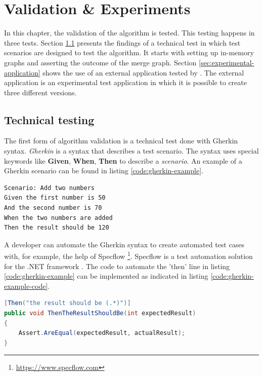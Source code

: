 \chapter{Validation \& Experiments}

In this chapter, the validation of the algorithm is tested. This testing happens in three tests. Section \ref{sec:scenarios-testing} presents the findings of a technical test in which test scenarios are designed to test the algorithm. It starts with setting up in-memory graphs and asserting the outcome of the merge graph. Section \ref{sec:experimental-application} shows the use of an external application tested by \testar. The external application is an experimental test application in which it is possible to create three different versions. 

\section{Technical testing} \label{sec:scenarios-testing}
The first form of algorithm validation is a technical test done with Gherkin syntax. \textit{Gherkin} is a syntax that describes a test scenario. The syntax uses special keywords like \textbf{Given}, \textbf{When}, \textbf{Then} to describe a \textit{scenario}. An example of a Gherkin scenario can be found in listing \ref{code:gherkin-example}.

\begin{lstlisting}[language=Gherkin, caption=Calculator test example, label=code:gherkin-example]
Scenario: Add two numbers
Given the first number is 50
And the second number is 70
When the two numbers are added
Then the result should be 120
\end{lstlisting}

A developer can automate the Gherkin syntax to create automated test cases with, for example, the help of Specflow \footnote{\url{https://www.specflow.com}}. Specflow is a test automation solution for the .NET framework \cite{specflow}. The code to automate the 'then' line in listing \ref{code:gherkin-example} can be implemented as indicated in listing \ref{code:gherkin-example-code}.

\begin{lstlisting}[language=Java, caption=Implementation of a 'then' line, label=code:gherkin-example-code]
[Then("the result should be (.*)")]
public void ThenTheResultShouldBe(int expectedResult)
{
    Assert.AreEqual(expectedResult, actualResult);
}
\end{lstlisting}


